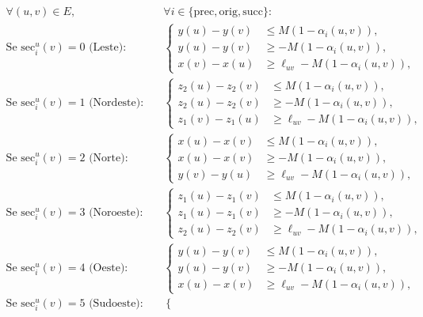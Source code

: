\documentclass[cic,tc]{infufrgs}
\begin{document}
\begin{align}
\forall (u, v) \in E, \quad &\forall i \in \{\text{prec}, \text{orig}, \text{succ}\}: \label{eq:octi_coords} \\[0.4em]
\text{Se } \text{sec}_i^u(v) = 0 \text{ (Leste):} \quad & \left\{ \begin{aligned}
y(u) - y(v) &\le M(1 - \alpha_i(u, v)), \\
y(u) - y(v) &\ge -M(1 - \alpha_i(u, v)), \\
x(v) - x(u) &\ge \ell_{uv} - M(1 - \alpha_i(u, v)),
\end{aligned} \right. \nonumber \\[0.4em]
\text{Se } \text{sec}_i^u(v) = 1 \text{ (Nordeste):} \quad & \left\{ \begin{aligned}
z_2(u) - z_2(v) &\le M(1 - \alpha_i(u, v)), \\
z_2(u) - z_2(v) &\ge -M(1 - \alpha_i(u, v)), \\
z_1(v) - z_1(u) &\ge \ell_{uv} - M(1 - \alpha_i(u, v)),
\end{aligned} \right. \nonumber \\[0.4em]
\text{Se } \text{sec}_i^u(v) = 2 \text{ (Norte):} \quad & \left\{ \begin{aligned}
x(u) - x(v) &\le M(1 - \alpha_i(u, v)), \\
x(u) - x(v) &\ge -M(1 - \alpha_i(u, v)), \\
y(v) - y(u) &\ge \ell_{uv} - M(1 - \alpha_i(u, v)),
\end{aligned} \right. \nonumber \\[0.4em]
\text{Se } \text{sec}_i^u(v) = 3 \text{ (Noroeste):} \quad & \left\{ \begin{aligned}
z_1(u) - z_1(v) &\le M(1 - \alpha_i(u, v)), \\
z_1(u) - z_1(v) &\ge -M(1 - \alpha_i(u, v)), \\
z_2(u) - z_2(v) &\ge \ell_{uv} - M(1 - \alpha_i(u, v)),
\end{aligned} \right. \nonumber \\[0.4em]
\text{Se } \text{sec}_i^u(v) = 4 \text{ (Oeste):} \quad & \left\{ \begin{aligned}
y(u) - y(v) &\le M(1 - \alpha_i(u, v)), \\
y(u) - y(v) &\ge -M(1 - \alpha_i(u, v)), \\
x(u) - x(v) &\ge \ell_{uv} - M(1 - \alpha_i(u, v)),
\end{aligned} \right. \nonumber \\[0.4em]
\text{Se } \text{sec}_i^u(v) = 5 \text{ (Sudoeste):} \quad & \left\{ \begin{aligned}

\end{aligned}
\end{align}
\end{document}
